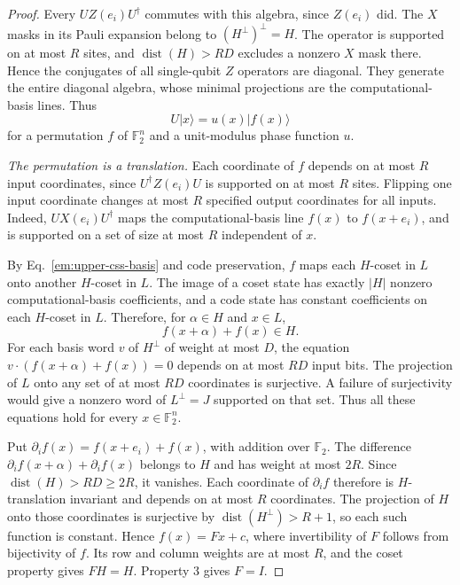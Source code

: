 \documentclass[aps,prl,reprint,notitlepage,nofootinbib,nobibnotes]{revtex4-2}
\begin{document}
\begin{proof}
Every $UZ(e_i)U^\dagger$ commutes with this algebra, since $Z(e_i)$ did. The $X$ masks in its Pauli
expansion belong to $(H^\perp)^\perp=H$. The operator is supported on at most $R$ sites, and
$\operatorname{dist}(H)>RD$ excludes a nonzero $X$ mask there. Hence the conjugates of all
single-qubit $Z$ operators are diagonal. They generate the entire diagonal algebra, whose minimal
projections are the computational-basis lines. Thus
\begin{equation}\label{em:upper-monomial}
 U|x\rangle=u(x)|f(x)\rangle
\end{equation}
for a permutation $f$ of $\mathbb F_2^n$ and a unit-modulus phase function $u$.

\emph{The permutation is a translation.}
Each coordinate of $f$ depends on at most $R$ input coordinates, since $U^\dagger Z(e_i)U$ is
supported on at most $R$ sites. Flipping one input coordinate changes at most $R$ specified output
coordinates for all inputs. Indeed, $UX(e_i)U^\dagger$ maps the computational-basis line $f(x)$ to
$f(x+e_i)$, and is supported on a set of size at most $R$ independent of $x$.

By Eq.~\eqref{em:upper-css-basis} and code preservation, $f$ maps each $H$-coset in $L$ onto
another $H$-coset in $L$. The image of a coset state has exactly $|H|$ nonzero computational-basis
coefficients, and a code state has constant coefficients on each $H$-coset in $L$. Therefore, for
$\alpha\in H$ and $x\in L$,
\[
 f(x+\alpha)+f(x)\in H .
\]
For each basis word $v$ of $H^\perp$ of weight at most $D$, the equation
$v\cdot(f(x+\alpha)+f(x))=0$ depends on at most $RD$ input bits. The projection of $L$ onto any set
of at most $RD$ coordinates is surjective. A failure of surjectivity would give a nonzero word of
$L^\perp=J$ supported on that set. Thus all these equations hold for every $x\in\mathbb F_2^n$.

Put $\partial_i f(x)=f(x+e_i)+f(x)$, with addition over $\mathbb F_2$. The difference $\partial_i
f(x+\alpha)+\partial_i f(x)$ belongs to $H$ and has weight at most $2R$. Since
$\operatorname{dist}(H)>RD\ge2R$, it vanishes. Each coordinate of $\partial_i f$ therefore is
$H$-translation invariant and depends on at most $R$ coordinates. The projection of $H$ onto those
coordinates is surjective by $\operatorname{dist}(H^\perp)>R+1$, so each such function is constant.
Hence $f(x)=Fx+c$, where invertibility of $F$ follows from bijectivity of $f$. Its row and column
weights are at most $R$, and the coset property gives $FH=H$. Property 3 gives $F=I$.


\end{proof}
\end{document}
